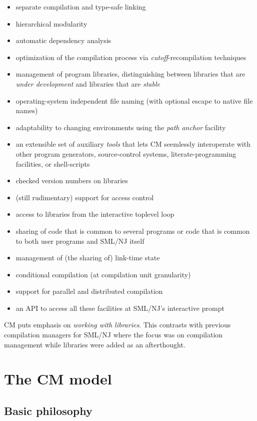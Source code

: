 \documentclass[titlepage,letterpaper]{article}
\begin{document}
\begin{itemize}
\item separate compilation and type-safe linking~\cite{appel94:sepcomp}
\item hierarchical modularity~\cite{blume:appel:cm99}
\item automatic dependency analysis~\cite{blume:depend99}
\item optimization of the compilation process via {\em
cutoff}-recompilation techniques~\cite{tichy94}
\item management of program libraries, distinguishing between libraries
that are {\em under development} and libraries that are {\em stable}
\item operating-system independent file naming (with optional escape
to native file names)
\item adaptability to changing environments using the {\em path anchor}
facility
\item an extensible set of auxiliary {\em tools} that lets CM
seemlessly interoperate with other program generators, source-control
systems, literate-programming facilities, or shell-scripts
\item checked version numbers on libraries
\item (still rudimentary) support for access control
\item access to libraries from the interactive toplevel loop
\item sharing of code that is common to several programs or code that
is common to both user programs and SML/NJ itself
\item management of (the sharing of) link-time state
\item conditional compilation (at compilation unit granularity)
\item support for parallel and distributed compilation
\item an API to access all these facilities at SML/NJ's interactive
prompt
\end{itemize}

CM puts emphasis on {\em working with libraries}.  This contrasts with
previous compilation managers for SML/NJ where the focus was on
compilation management while libraries were added as an afterthought.

\section{The CM model}

\subsection{Basic philosophy}
\end{document}
